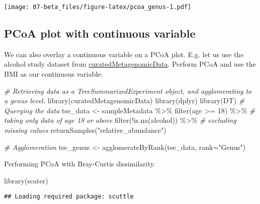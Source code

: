 \documentclass[
  oneside]{book}
\newenvironment{Shaded}{\begin{snugshade}}{\end{snugshade}}
\newcommand{\AttributeTok}[1]{\textcolor[rgb]{0.77,0.63,0.00}{#1}}
\newcommand{\CommentTok}[1]{\textcolor[rgb]{0.56,0.35,0.01}{\textit{#1}}}
\newcommand{\DecValTok}[1]{\textcolor[rgb]{0.00,0.00,0.81}{#1}}
\newcommand{\FunctionTok}[1]{\textcolor[rgb]{0.00,0.00,0.00}{#1}}
\newcommand{\NormalTok}[1]{#1}
\newcommand{\OtherTok}[1]{\textcolor[rgb]{0.56,0.35,0.01}{#1}}
\newcommand{\SpecialCharTok}[1]{\textcolor[rgb]{0.00,0.00,0.00}{#1}}
\newcommand{\StringTok}[1]{\textcolor[rgb]{0.31,0.60,0.02}{#1}}
\begin{document}
\texttt{[image: 07-beta\_files/figure-latex/pcoa\_genus-1.pdf]}

\hypertarget{pcoa-plot-with-continuous-variable}{%
\subsection{PCoA plot with continuous variable}\label{pcoa-plot-with-continuous-variable}}

We can also overlay a continuous variable on a PCoA plot. E.g. let us
use the alcohol study dataset from \href{https://bioconductor.org/packages/release/data/experiment/vignettes/curatedMetagenomicData/inst/doc/curatedMetagenomicData.html}{curatedMetagenomicData}.
Perform PCoA and use the BMI as our continuous variable:

\begin{Shaded}
\begin{Highlighting}[]
\CommentTok{\# Retrieving data as a TreeSummarizedExperiment object, and agglomerating to a genus level.}
\FunctionTok{library}\NormalTok{(curatedMetagenomicData)}
\FunctionTok{library}\NormalTok{(dplyr)}
\FunctionTok{library}\NormalTok{(DT)}
\CommentTok{\# Querying the data}
\NormalTok{tse\_data }\OtherTok{\textless{}{-}}\NormalTok{ sampleMetadata }\SpecialCharTok{\%\textgreater{}\%}
    \FunctionTok{filter}\NormalTok{(age }\SpecialCharTok{\textgreater{}=} \DecValTok{18}\NormalTok{) }\SpecialCharTok{\%\textgreater{}\%} \CommentTok{\# taking only data of age 18 or above}
    \FunctionTok{filter}\NormalTok{(}\SpecialCharTok{!}\FunctionTok{is.na}\NormalTok{(alcohol)) }\SpecialCharTok{\%\textgreater{}\%} \CommentTok{\# excluding missing values}
    \FunctionTok{returnSamples}\NormalTok{(}\StringTok{"relative\_abundance"}\NormalTok{)}

\CommentTok{\# Agglomeration}
\NormalTok{tse\_genus }\OtherTok{\textless{}{-}} \FunctionTok{agglomerateByRank}\NormalTok{(tse\_data, }\AttributeTok{rank=}\StringTok{"Genus"}\NormalTok{)}
\end{Highlighting}
\end{Shaded}

Performing PCoA with Bray-Curtis dissimilarity.

\begin{Shaded}
\begin{Highlighting}[]
\FunctionTok{library}\NormalTok{(scater)}
\end{Highlighting}
\end{Shaded}

\begin{verbatim}
## Loading required package: scuttle
\end{verbatim}
\end{document}
